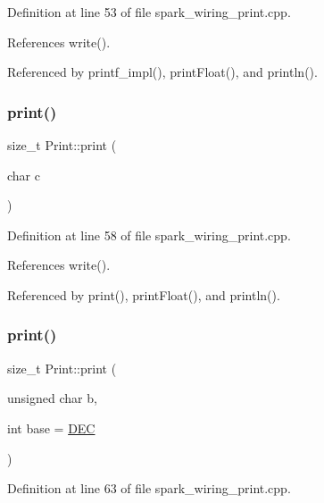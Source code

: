 Definition at line 53 of file spark\+\_\+wiring\+\_\+print.\+cpp.



References write().



Referenced by printf\+\_\+impl(), print\+Float(), and println().

\mbox{\label{class_print_a1e411d07a8ffec5faf7ce485bac0f029}} 
\subsubsection{\texorpdfstring{print()}{print()}\hspace{0.1cm}{\footnotesize\ttfamily [2/19]}}
{\footnotesize\ttfamily size\+\_\+t Print\+::print (\begin{DoxyParamCaption}\item[{char}]{c }\end{DoxyParamCaption})}



Definition at line 58 of file spark\+\_\+wiring\+\_\+print.\+cpp.



References write().



Referenced by print(), print\+Float(), and println().

\mbox{\label{class_print_a97bd44df9222fa4a51a1266fab8d3bc1}} 
\subsubsection{\texorpdfstring{print()}{print()}\hspace{0.1cm}{\footnotesize\ttfamily [3/19]}}
{\footnotesize\ttfamily size\+\_\+t Print\+::print (\begin{DoxyParamCaption}\item[{unsigned char}]{b,  }\item[{int}]{base = {\ttfamily \hyperlink{docs_2src_2spark__wiring__print_8h_a26e216c38cffa0a9965fa7933ba558b1}{D\+EC}} }\end{DoxyParamCaption})}



Definition at line 63 of file spark\+\_\+wiring\+\_\+print.\+cpp.



